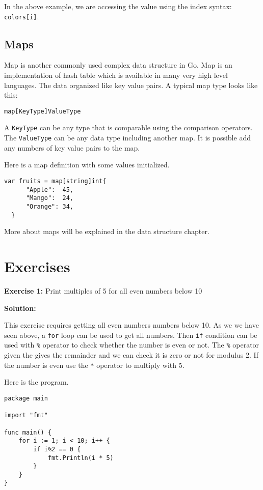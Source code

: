 In the above example, we are accessing the value using the index
syntax: \texttt{colors[i]}.

\subsection{Maps}

Map is another commonly used complex data structure in Go.
Map is an implementation of hash table which is available in many very
high level languages.  The data organized like key value pairs.  A
typical map type looks like this:

\begin{lstlisting}[numbers=none]
map[KeyType]ValueType
\end{lstlisting}

A \texttt{KeyType} can be any type that is comparable using the
comparison operators.  The \texttt{ValueType} can be any data type
including another map.  It is possible add any numbers of key value
pairs to the map.

Here is a map definition with some values initialized.

\begin{lstlisting}[numbers=none]
var fruits = map[string]int{
      "Apple":  45,
      "Mango":  24,
      "Orange": 34,
  }
\end{lstlisting}

More about maps will be explained in the data structure chapter.

\section{Exercises}

\textbf{Exercise 1:} Print multiples of 5 for all even numbers below 10

\textbf{Solution:}

This exercise requires getting all even numbers numbers below 10.  As
we we have seen above, a \texttt{for} loop can be used to get all
numbers.  Then \texttt{if} condition can be used with \texttt{\%}
operator to check whether the number is even or not.  The \texttt{\%}
operator given the gives the remainder and we can check it is zero or
not for modulus 2.  If the number is even use the \texttt{*} operator
to multiply with 5.

Here is the program.

\begin{lstlisting}[numbers=none]
package main

import "fmt"

func main() {
    for i := 1; i < 10; i++ {
        if i%2 == 0 {
            fmt.Println(i * 5)
        }
    }
}
\end{lstlisting}

